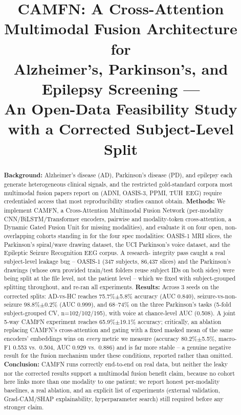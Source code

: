 \documentclass[conference]{IEEEtran}
\begin{document}
\title{CAMFN: A Cross-Attention Multimodal Fusion Architecture for\\
Alzheimer's, Parkinson's, and Epilepsy Screening --- \\
An Open-Data Feasibility Study with a Corrected Subject-Level Split}

\author{
}

\maketitle

\begin{abstract}
\textbf{Background:} Alzheimer's disease (AD), Parkinson's disease (PD),
and epilepsy each generate heterogeneous clinical signals, and the
restricted gold-standard corpora most multimodal fusion papers report on
(ADNI, OASIS-3, PPMI, TUH~EEG) require credentialed access that most
reproducibility studies cannot obtain.
\textbf{Methods:} We implement CAMFN, a Cross-Attention Multimodal
Fusion Network (per-modality CNN/BiLSTM/Transformer encoders, pairwise
and modality-token cross-attention, a Dynamic Gated Fusion Unit for
missing modalities), and evaluate it on four open, non-overlapping
cohorts standing in for the four spec modalities: OASIS-1 MRI slices,
the Parkinson's spiral/wave drawing dataset, the UCI Parkinson's voice
dataset, and the Epileptic Seizure Recognition EEG corpus. A research-
integrity pass caught a real subject-level leakage bug -- OASIS-1 (347
subjects, 86{,}437 slices) and the Parkinson's drawings (whose own
provided train/test folders reuse subject IDs on both sides) were being
split at the file level, not the patient level -- which we fixed with
subject-grouped splitting throughout, and re-ran all experiments.
\textbf{Results:} Across 3 seeds on the corrected splits: AD-vs-HC
reaches 75.7\%$\pm$5.8\% accuracy (AUC 0.840), seizure-vs-non-seizure
98.8\%$\pm$0.2\% (AUC 0.999), and 68--74\% on the three Parkinson's
tasks (5-fold subject-grouped CV, n=102/102/195), with voice at
chance-level AUC (0.508). A joint 5-way CAMFN experiment reaches
65.9\%$\pm$19.1\% accuracy; critically, an ablation replacing CAMFN's
cross-attention and gating with a fixed masked mean of the same
encoders' embeddings wins on \emph{every} metric we measure (accuracy
80.2\%$\pm$5.5\%, macro-F1 0.553 vs.\ 0.504, AUC 0.929 vs.\ 0.886) and is
far more stable -- a genuine negative result for the fusion mechanism
under these conditions, reported rather than omitted.
\textbf{Conclusion:} CAMFN runs correctly end-to-end on real data, but
neither the leaky nor the corrected results support a multimodal fusion
benefit claim, because no cohort here links more than one modality to
one patient; we report honest per-modality baselines, a real ablation,
and an explicit list of experiments (external validation, Grad-CAM/SHAP
explainability, hyperparameter search) still required before any
stronger claim.
\end{abstract}
\end{document}
